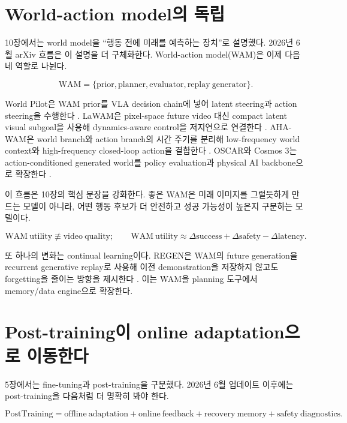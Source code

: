 \section{World-action model의 독립}

10장에서는 world model을 ``행동 전에 미래를 예측하는 장치''로 설명했다. 2026년 6월 arXiv 흐름은 이 설명을 더 구체화한다. World-action model(WAM)은 이제 다음 네 역할로 나뉜다.

\begin{equation}
  \mathrm{WAM}
  =
  \{\mathrm{prior}, \mathrm{planner}, \mathrm{evaluator}, \mathrm{replay\ generator}\}.
\end{equation}

World Pilot은 WAM prior를 VLA decision chain에 넣어 latent steering과 action steering을 수행한다 \citep{worldpilot2026}. LaWAM은 pixel-space future video 대신 compact latent visual subgoal을 사용해 dynamics-aware control을 저지연으로 연결한다 \citep{lawam2026}. AHA-WAM은 world branch와 action branch의 시간 주기를 분리해 low-frequency world context와 high-frequency closed-loop action을 결합한다 \citep{ahawam2026}. OSCAR와 Cosmos 3는 action-conditioned generated world를 policy evaluation과 physical AI backbone으로 확장한다 \citep{oscar2026,cosmos3}.

이 흐름은 10장의 핵심 문장을 강화한다. 좋은 WAM은 미래 이미지를 그럴듯하게 만드는 모델이 아니라, 어떤 행동 후보가 더 안전하고 성공 가능성이 높은지 구분하는 모델이다.

\begin{equation}
  \mathrm{WAM\ utility}
  \not\equiv
  \mathrm{video\ quality};
  \qquad
  \mathrm{WAM\ utility}
  \approx
  \Delta\mathrm{success}
  +
  \Delta\mathrm{safety}
  -
  \Delta\mathrm{latency}.
\end{equation}

또 하나의 변화는 continual learning이다. REGEN은 WAM의 future generation을 recurrent generative replay로 사용해 이전 demonstration을 저장하지 않고도 forgetting을 줄이는 방향을 제시한다 \citep{regenwam2026}. 이는 WAM을 planning 도구에서 memory/data engine으로 확장한다.

\section{Post-training이 online adaptation으로 이동한다}

5장에서는 fine-tuning과 post-training을 구분했다. 2026년 6월 업데이트 이후에는 post-training을 다음처럼 더 명확히 봐야 한다.

\begin{equation}
  \mathrm{PostTraining}
  =
  \mathrm{offline\ adaptation}
  +
  \mathrm{online\ feedback}
  +
  \mathrm{recovery\ memory}
  +
  \mathrm{safety\ diagnostics}.
\end{equation}

